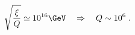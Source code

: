 \begin{equation}
\label{eq:Dnorm}
\sqrt{\frac{\xi}{Q}} \simeq 10^{16} \GeV \quad \Rightarrow \quad Q
\sim 10^6 \;.  
\end{equation} 
